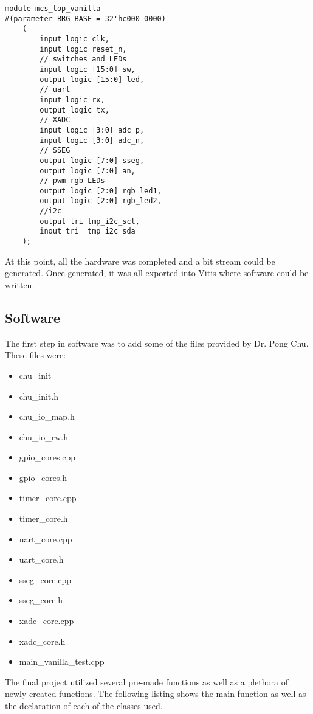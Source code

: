 \documentclass[11pt]{article}
\begin{document}
\begin{lstlisting}[style=Verilog,caption=Top Level ,label=code:ex ]
module mcs_top_vanilla
#(parameter BRG_BASE = 32'hc000_0000)	
	(
		input logic clk,
		input logic reset_n,
		// switches and LEDs
		input logic [15:0] sw,
		output logic [15:0] led,
		// uart
		input logic rx,
		output logic tx, 
		// XADC     
		input logic [3:0] adc_p, 
		input logic [3:0] adc_n,
		// SSEG
		output logic [7:0] sseg, 
		output logic [7:0] an,
		// pwm rgb LEDs          
		output logic [2:0] rgb_led1, 
		output logic [2:0] rgb_led2, 
		//i2c 
		output tri tmp_i2c_scl,
		inout tri  tmp_i2c_sda         
	);

\end{lstlisting}

\quad At this point, all the hardware was completed and a bit stream could be generated. Once generated, it was all exported into Vitis where software could be written. 
\newpage
\subsection{Software}
\quad The first step in software was to add some of the files provided by Dr. Pong Chu. These files were: 

\begin{multicols}{2}
	\begin{itemize}
		\item chu\_init
		\item chu\_init.h
		\item chu\_io\_map.h
		\item chu\_io\_rw.h
		\item gpio\_cores.cpp
		\item gpio\_cores.h
		\item timer\_core.cpp
		\item timer\_core.h
		\item uart\_core.cpp
		\item uart\_core.h
		\item sseg\_core.cpp
		\item sseg\_core.h
		\item xadc\_core.cpp
		\item xadc\_core.h 
		\item main\_vanilla\_test.cpp	
	\end{itemize}
\end{multicols}

\quad The final project utilized several pre-made functions as well as a plethora of newly created functions. The following listing shows the main function as well as the declaration of each of the classes used. 
\end{document}
